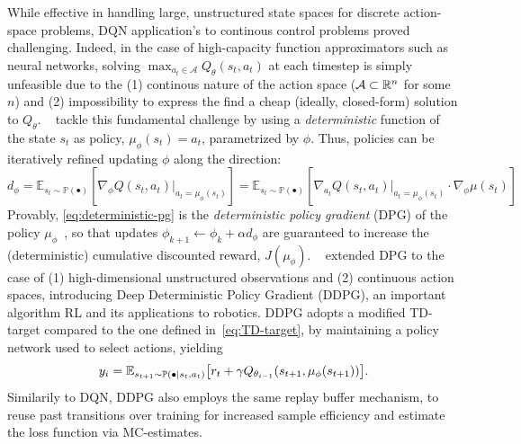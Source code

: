 While effective in handling large, unstructured state spaces for discrete action-space problems, DQN application's to continous control problems proved challenging.
Indeed, in the case of high-capacity function approximators such as neural networks, solving \( \max_{a_t \in \mathcal A} Q_\theta(s_t, a_t) \) at each timestep is simply unfeasible due to the (1) continous nature of the action space (\( \mathcal A \subset \mathbb R^n \) for some \( n \)) and (2) impossibility to express the find a cheap (ideally, closed-form) solution to \( Q_\theta \).
~\citet{silverDeterministicPolicyGradient2014} tackle this fundamental challenge by using a \emph{deterministic} function of the state \( s_t \) as policy, \( \mu_\phi(s_t) = a_t \), parametrized by \( \phi \). Thus, policies can be iteratively refined updating \( \phi \) along the direction:
\begin{equation}\label{eq:deterministic-pg}
    d_\phi = \mathbb E_{s_t \sim \mathbb P (\bullet)} \left[ \nabla_\phi Q(s_t, a_t)\vert_{a_t = \mu_\phi(s_t)} \right] = \mathbb E_{s_t \sim \mathbb P(\bullet)} \left[ \nabla_{a_t} Q(s_t, a_t) \vert_{a_t = \mu_\phi(s_t)} \cdot \nabla_\phi \mu(s_t) \right]
\end{equation}
Provably, \ref{eq:deterministic-pg} is the \emph{deterministic policy gradient} (DPG) of the policy \(\mu_\phi \)~\citep{silverDeterministicPolicyGradient2014}, so that updates \( \phi_{k+1}\leftarrow \phi_k + \alpha d_\phi \) are guaranteed to increase the (deterministic) cumulative discounted reward, \( J(\mu_\phi) \).
~\citet{lillicrapContinuousControlDeep2019} extended DPG to the case of (1) high-dimensional unstructured observations and (2) continuous action spaces, introducing Deep Deterministic Policy Gradient (DDPG), an important algorithm RL and its applications to robotics.
DDPG adopts a modified TD-target compared to the one defined in~\ref{eq:TD-target}, by maintaining a policy network used to select actions, yielding
\begin{equation}\label{eq:TD-target-ddpg}
y_i = \mathbb E_{s_{t+1} \sim \mathbb P(\bullet \vert s_t, a_t)} \big[ r_t + \gamma Q_{\theta_{i-1}} (s_{t+1}, \mu_\phi(s_{t+1})) \big] .
\end{equation}
Similarily to DQN, DDPG also employs the same replay buffer mechanism, to reuse past transitions over training for increased sample efficiency and estimate the loss function via MC-estimates.

